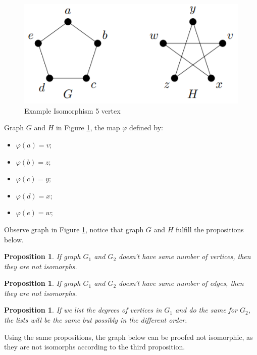 \documentclass{article}
\theoremstyle{plain}%
\newtheorem{prop}[thm]{Proposition}
\theoremstyle{definition}
\theoremstyle{remark}
\begin{document}
	\begin{figure}[htbp]
		\center
		\includegraphics[scale=0.4]{img/isomorph-b.png}
		\caption{Example Isomorphism 5 vertex}
		\label{fig-ex-isomorphism-2}
	\end{figure}

	Graph $G$ and $H$ in Figure \ref{fig-ex-isomorphism-2}, the map $\varphi$ defined by:

	\begin{itemize}
		\item $\varphi (a) = v;$
		\item $\varphi (b) = z;$
		\item $\varphi (c) = y;$
		\item $\varphi (d) = x;$
		\item $\varphi (e) = w;$
	\end{itemize}

	Observe graph in Figure \ref{fig-ex-isomorphism-2}, notice that graph $G$ and $H$ fulfill the propositions below.

	\begin{prop}
			If graph $G_1$ and $G_2$ doesn't have same number of vertices, then they are not isomorphs.
	\end{prop}

	\begin{prop}
			If graph $G_1$ and $G_2$ doesn't have same number of edges, then they are not isomorphs.
	\end{prop}

	\begin{prop}
			If we list the degrees of vertices in $G_1$ and do the same for $G_2$, the lists will be the same but possibly in the different order.
	\end{prop}

	Using the same propositions, the graph below can be proofed not isomorphic, as they are not isomorphs according to the third proposition.
\end{document}
